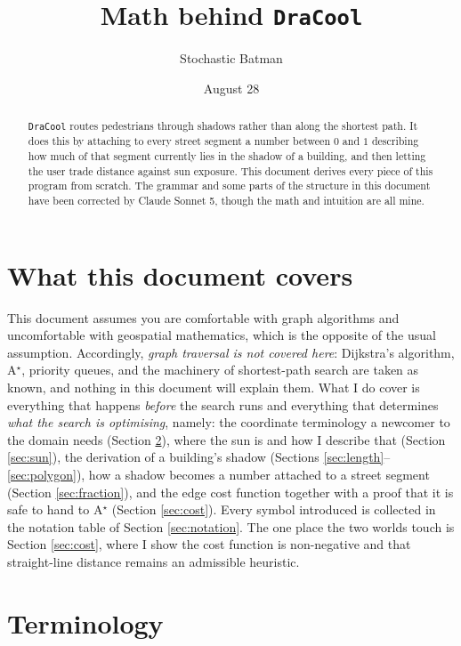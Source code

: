 \documentclass[11pt,a4paper]{article}
\title{Math behind \texttt{DraCool}}
\author{Stochastic Batman}
\date{August 28}
\theoremstyle{plain}
\theoremstyle{definition}
\theoremstyle{remark}
\begin{document}
\maketitle

\begin{abstract}
\texttt{DraCool} routes pedestrians through shadows rather than along the shortest path. It does this by attaching to every street segment a number between $0$ and $1$ describing how much of that segment currently lies in the shadow of a building, and then letting the user trade distance against sun exposure. This document derives every piece of this program from scratch. The grammar and some parts of the structure in this document have been corrected by Claude Sonnet 5, though the math and intuition are all mine.

\end{abstract}

\section{What this document covers}

This document assumes you are comfortable with graph algorithms and uncomfortable with geospatial mathematics, which is the opposite of the usual assumption. Accordingly, \emph{graph traversal is not covered here}: Dijkstra's algorithm, A$^\star$, priority queues, and the machinery of shortest-path search are taken as known, and nothing in this document will explain them. What I do cover is everything that happens \emph{before} the search runs and everything that determines \emph{what the search is optimising}, namely: the coordinate terminology a newcomer to the domain needs (Section \ref{sec:terms}), where the sun is and how I describe that (Section \ref{sec:sun}), the derivation of a building's shadow (Sections \ref{sec:length}--\ref{sec:polygon}), how a shadow becomes a number attached to a street segment (Section \ref{sec:fraction}), and the edge cost function together with a proof that it is safe to hand to A$^\star$ (Section \ref{sec:cost}). Every symbol introduced is collected in the notation table of Section \ref{sec:notation}. The one place the two worlds touch is Section \ref{sec:cost}, where I show the cost function is non-negative and that straight-line distance remains an admissible heuristic.

\section{Terminology}
\label{sec:terms}
\end{document}
